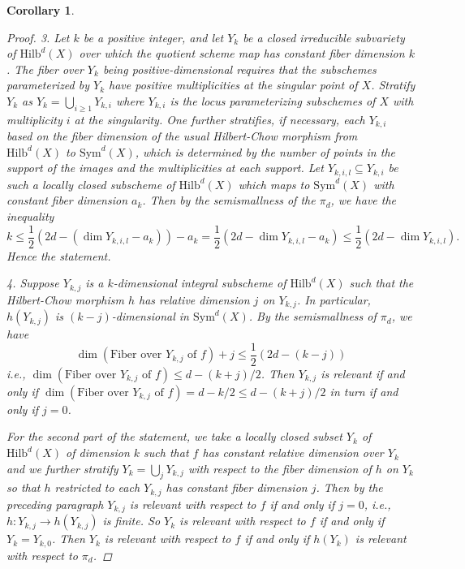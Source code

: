 \documentclass{amsart}[12pt]
\newtheorem{cor}[theorem]{Corollary}
\theoremstyle{definition}
\theoremstyle{remark}
\numberwithin{equation}{section}
\begin{document}
\begin{cor}
\begin{proof}
3. Let $k$ be a positive integer, and let $Y_k$ be a closed irreducible subvariety of $\mathrm{Hilb}^d(X)$ over which the quotient scheme map has constant fiber dimension $k$. The fiber over $Y_k$ being positive-dimensional requires that the subschemes parameterized by $Y_k$ have positive multiplicities at the singular point of $X$. Stratify $Y_k$ as $Y_k = \bigcup_{i \geq 1}Y_{k, i}$ where $Y_{k, i}$ is the locus parameterizing subschemes of $X$ with multiplicity $i$ at the singularity. One further stratifies, if necessary, each $Y_{k, i}$ based on the fiber dimension of the usual Hilbert-Chow morphism from $\mathrm{Hilb}^d(X)$ to $\mathrm{Sym}^d(X)$, which is determined by the number of points in the support of the images and the multiplicities at each support. Let $Y_{k, i, l} \subseteq Y_{k, i}$ be such a locally closed subscheme of $\mathrm{Hilb}^d(X)$ which maps to $\mathrm{Sym}^d(X)$ with constant fiber dimension $a_k$. Then by the semismallness of the $\pi_d$, we have the inequality 
\[
k \leq \dfrac{1}{2}(2d - (\dim Y_{k, i, l} - a_k)) - a_k = \dfrac{1}{2}(2d - \dim Y_{k, i, l} - a_k) \leq \dfrac{1}{2}(2d - \dim Y_{k, i, l}).
\]
Hence the statement.

4. Suppose $Y_{k, j}$ is a $k$-dimensional integral subscheme of $\mathrm{Hilb}^{d}(X)$ such that the Hilbert-Chow morphism $h$ has relative dimension $j$ on $Y_{k, j}$. In particular, $h(Y_{k, j})$ is $(k - j)$-dimensional in $\mathrm{Sym}^d(X)$. By the semismallness of $\pi_d$, we have 
\[
\dim (\textrm{Fiber over } Y_{k, j} \textrm{ of } f) + j \leq \dfrac{1}{2}(2d - (k - j))
\]
i.e., $\dim (\textrm{Fiber over } Y_{k, j} \textrm{ of } f) \leq d - (k + j)/2$. Then $Y_{k, j}$ is relevant if and only if $\dim (\textrm{Fiber over } Y_{k, j} \textrm{ of } f) = d - k/2  \leq d - (k + j)/2$ in turn if and only if $j = 0$. 

For the second part of the statement, we take a locally closed subset $Y_k$ of $\mathrm{Hilb}^{d}(X)$ of dimension $k$ such that $f$ has constant relative dimension over $Y_k$ and we further stratify $Y_k = \bigcup_j Y_{k, j}$ with respect to the fiber dimension of $h$ on $Y_k$ so that $h$ restricted to each $Y_{k, j}$ has constant fiber dimension $j$. Then by the preceding paragraph $Y_{k, j}$ is relevant with respect to $f$ if and only if $j = 0$, i.e., $h: Y_{k, j} \to h(Y_{k, j})$ is finite. So $Y_k$ is relevant with respect to $f$ if and only if $Y_k = Y_{k, 0}$. Then $Y_k$ is relevant with respect to $f$ if and only if $h(Y_k)$ is relevant with respect to $\pi_d$.
\end{proof}
\end{cor}
\end{document}
